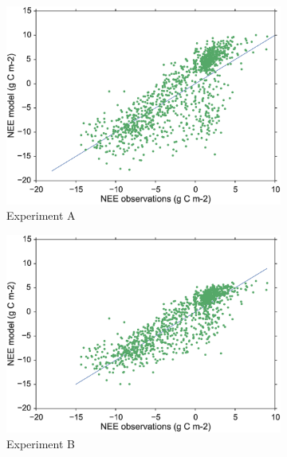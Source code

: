 \documentclass[11pt]{article}
\begin{document}
\begin{figure}
    \centering
    \begin{subfigure}[b]{0.49\textwidth}
        \includegraphics[width=\textwidth]{Afscat.eps}
        \caption{Experiment A}
        \label{fig:forecastscatBR}
    \end{subfigure}
    \begin{subfigure}[b]{0.49\textwidth}
        \includegraphics[width=\textwidth]{Bfscat.eps}
        \caption{Experiment B}
        \label{fig:forecastscatedcBR}
    \end{subfigure}
    \begin{subfigure}[b]{0.49\textwidth}

\end{subfigure}
\end{figure}
\end{document}
